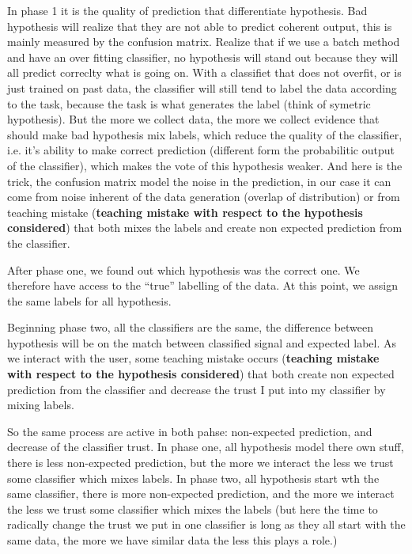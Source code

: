 In phase 1 it is the quality of prediction that differentiate hypothesis. Bad hypothesis will realize that they are not able to predict coherent output, this is mainly measured by the confusion matrix. Realize that if we use a batch method and have an over fitting classifier, no hypothesis will stand out because they will all predict correclty what is going on. With a classifiet that does not overfit, or is just trained on past data, the classifier will still tend to label the data according to the task, because the task is what generates the label (think of symetric hypothesis). But the more we collect data, the more we collect evidence that should make bad hypothesis mix labels, which reduce the quality of the classifier, i.e. it's ability to make correct prediction (different form the probabilitic output of the classifier), which makes the vote of this hypothesis weaker. And here is the trick, the confusion matrix model the noise in the prediction, in our case it can come from noise inherent of the data generation (overlap of distribution) or from teaching mistake (\textbf{teaching mistake with respect to the hypothesis considered}) that both mixes the labels and create non expected prediction from the classifier.

After phase one, we found out which hypothesis was the correct one. We therefore have access to the ``true'' labelling of the data. At this point, we assign the same labels for all hypothesis.

Beginning phase two, all the classifiers are the same, the difference between hypothesis will be on the match between classified signal and expected label. As we interact with the user, some teaching mistake occurs (\textbf{teaching mistake with respect to the hypothesis considered}) that both create non expected prediction from the classifier and decrease the trust I put into my classifier by mixing labels.

So the same process are active in both pahse: non-expected prediction, and decrease of the classifier trust.
In phase one, all hypothesis model there own stuff, there is less non-expected prediction, but the more we interact the less we trust some classifier which mixes labels.
In phase two, all hypothesis start wth the same classifier, there is more non-expected prediction, and the more we interact the less we trust some classifier which mixes the labels (but here the time to radically change the trust we put in one classifier is long as they all start with the same data, the more we have similar data the less this plays a role.)

